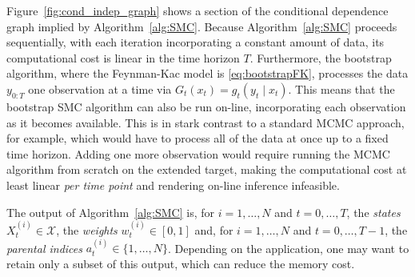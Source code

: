 Figure~\ref{fig:cond_indep_graph} shows a section of the conditional dependence graph implied by Algorithm~\ref{alg:SMC}.
Because Algorithm~\ref{alg:SMC} proceeds sequentially, with each iteration incorporating a constant amount of data, its computational cost is linear in the time horizon $T$. Furthermore, the bootstrap algorithm, where the Feynman-Kac model is \eqref{eq:bootstrapFK}, processes the data $y_{0:T}$ one observation at a time via $G_t(x_t) = g_t(y_t \mid x_t)$. This means that the bootstrap SMC algorithm can also be run on-line, incorporating each observation as it becomes available.
This is in stark contrast to a standard MCMC approach, for example, which would have to process all of the data at once up to a fixed time horizon. Adding one more observation would require running the MCMC algorithm from scratch on the extended target, making the computational cost at least linear \emph{per time point} and rendering on-line inference infeasible.

The output of Algorithm~\ref{alg:SMC} is, for $i=1,\dots, N$ and $t=0,\dots,T$, the \emph{states} $X_t^{(i)} \in \mathcal{X}$, the \emph{weights} $w_t^{(i)} \in [0,1]$ and, for $i=1,\dots, N$ and $t=0,\dots,T-1$, the \emph{parental indices} $a_t^{(i)} \in \{1,\dots,N\}$.
Depending on the application, one may want to retain only a subset of this output, which can reduce the memory cost.


